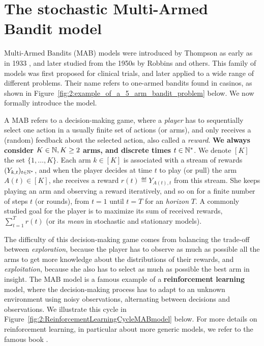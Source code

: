 

\section{The stochastic Multi-Armed Bandit model}
\label{sec:2:notations}


Multi-Armed Bandits (MAB) models were introduced by Thompson as early as in 1933 \cite{Thompson33}, and later studied from the 1950s by Robbins \cite{Robbins52} and others.
This family of models was first proposed for clinical trials, and later applied to a wide range of different problems.
Their name refers to one-armed bandits found in casinos, as shown in Figure~\ref{fig:2:example_of_a_5_arm_bandit_problem} below.
%
We now formally introduce the model.

A MAB refers to a decision-making game, where a \emph{player} has to sequentially select one action in a usually finite set of actions (or arms), and only receives a (random) feedback about the selected action, also called a \emph{reward}.
\textbf{We always consider $K\in\mathbb{N}, K\geq2$ arms, and discrete times $t\in\mathbb{N}^*$}.
We denote $[K]$ the set $\{1,\dots,K\}$.
Each arm $k\in[K]$ is associated with a stream of rewards $(Y_{k,t})_{t\in\mathbb{N}^*}$,
and when the player decides at time $t$ to play (or pull) the arm $A(t)\in[K]$,
she receives a reward $r(t) \eqdef Y_{A(t),t}$ from this stream.
She keeps playing an arm and observing a reward iteratively, and so on for a finite number of steps $t$ (or rounds), from $t=1$ until $t=T$ for an \emph{horizon} $T$.
%
A commonly studied goal for the player is to maximize its sum of received rewards, $\sum_{t=1}^T r(t)$
(or its \emph{mean} in stochastic and stationary models).


The difficulty of this decision-making game comes from balancing the trade-off between \emph{exploration}, because the player has to observe as much as possible all the arms to get more knowledge about the distributions of their rewards, and \emph{exploitation}, because she also has to select as much as possible the best arm in insight.
The MAB model is a famous example of a \textbf{reinforcement learning} model, where the decision-making process has to adapt to an unknown environment using noisy observations, alternating between decisions and observations.
We illustrate this cycle in Figure~\ref{fig:2:ReinforcementLearningCycleMABmodel} below.
For more details on reinforcement learning, in particular about more generic models, we refer to the famous book \cite{SuttonBarto2018}.


